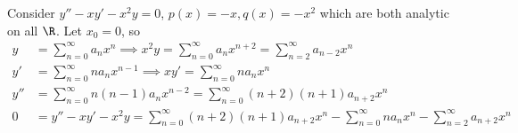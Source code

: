 \begin{example}
    Consider $y'' - xy' - x^2y = 0$, $p(x) = -x, q(x) = -x^2$ which are both analytic on all $\R$. Let $x_0 = 0$, so 
    \begin{align*}
        y &= \sum_{n=0}^\infty a_nx^n \implies x^2 y = \sum_{n=0}^\infty a_n x^{n+2} = \sum_{n = 2}^\infty a_{n-2}x^n\\
        y' &= \sum_{n=0}^\infty na_nx^{n-1} \implies xy' = \sum_{n=0}^\infty n a_nx^n\\
        y'' &= \sum_{n = 0}^\infty n(n-1)a_nx^{n-2} = \sum_{n=0}^\infty (n+2)(n+1)a_{n+2}x^{n}\\
        0 &= y'' - xy' - x^2y = \sum_{n=0}^\infty (n+2)(n+1)a_{n+2}x^{n} -\sum_{n=0}^\infty n a_nx^n - \sum_{n = 2}^\infty a_{n+2}x^n
    \end{align*}
\end{example}